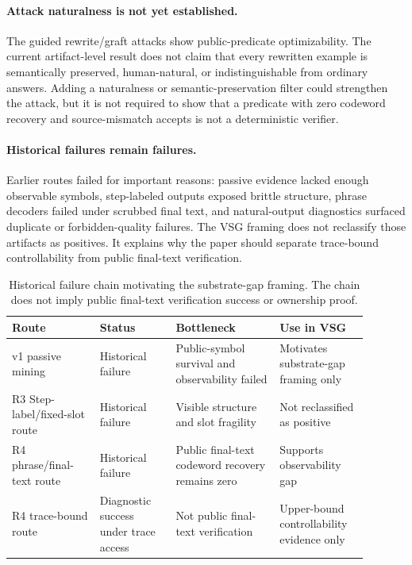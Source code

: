 \paragraph{Attack naturalness is not yet established.}
The guided rewrite/graft attacks show public-predicate optimizability.  The
current artifact-level result does not claim that every rewritten example is
semantically preserved, human-natural, or indistinguishable from ordinary
answers.  Adding a naturalness or semantic-preservation filter could strengthen
the attack, but it is not required to show that a predicate with zero codeword
recovery and source-mismatch accepts is not a deterministic verifier.

\paragraph{Historical failures remain failures.}
Earlier routes failed for important reasons: passive evidence lacked enough
observable symbols, step-labeled outputs exposed brittle structure, phrase
decoders failed under scrubbed final text, and natural-output diagnostics
surfaced duplicate or forbidden-quality failures.  The VSG framing does not
reclassify those artifacts as positives.  It explains why the paper should
separate trace-bound controllability from public final-text verification.

\begin{table}[t]
\centering
\scriptsize
\setlength{\tabcolsep}{3pt}
\renewcommand{\arraystretch}{1.12}
\begin{tabular}{p{0.22\linewidth}p{0.19\linewidth}p{0.26\linewidth}p{0.22\linewidth}}
\toprule
Route & Status & Bottleneck & Use in VSG \\
\midrule
v1 passive mining & Historical failure & Public-symbol survival and observability failed & Motivates substrate-gap framing only \\
R3 Step-label/fixed-slot route & Historical failure & Visible structure and slot fragility & Not reclassified as positive \\
R4 phrase/final-text route & Historical failure & Public final-text codeword recovery remains zero & Supports observability gap \\
R4 trace-bound route & Diagnostic success under trace access & Not public final-text verification & Upper-bound controllability evidence only \\
\bottomrule
\end{tabular}
\caption{Historical failure chain motivating the substrate-gap framing.  The
chain does not imply public final-text verification success or ownership
proof.}
\label{tab:historical-chain}
\end{table}

